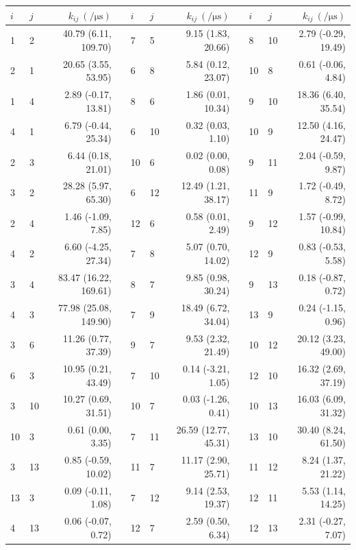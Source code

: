 \begin{table}[h!]
 \centering
 \begin{tabular}{llrp{0.2cm}llrp{0.2cm}llr}
 \toprule
 $i$ & $j$ &  $k_{ij}\ (\si{\per\micro\second})$ & & $i$ & $j$ &  $k_{ij}\ (\si{\per\micro\second})$ & & $i$ & $j$ &  $k_{ij}\ (\si{\per\micro\second})$ \\
 \midrule
 1 & 2 & 40.79 (6.11, 109.70) & & 7 & 5 & 9.15 (1.83, 20.66) & & 8 & 10 & 2.79 (-0.29, 19.49) \\
 2 & 1 & 20.65 (3.55, 53.95) & & 6 & 8 & 5.84 (0.12, 23.07) & & 10 & 8 & 0.61 (-0.06, 4.84) \\
 1 & 4 & 2.89 (-0.17, 13.81) & & 8 & 6 & 1.86 (0.01, 10.34) & & 9 & 10 & 18.36 (6.40, 35.54) \\
 4 & 1 & 6.79 (-0.44, 25.34) & & 6 & 10 & 0.32 (0.03, 1.10) & & 10 & 9 & 12.50 (4.16, 24.47) \\
 2 & 3 & 6.44 (0.18, 21.01) & & 10 & 6 & 0.02 (0.00, 0.08) & & 9 & 11 & 2.04 (-0.59, 9.87) \\
 3 & 2 & 28.28 (5.97, 65.30) & & 6 & 12 & 12.49 (1.21, 38.17) & & 11 & 9 & 1.72 (-0.49, 8.72) \\
 2 & 4 & 1.46 (-1.09, 7.85) & & 12 & 6 & 0.58 (0.01, 2.49) & & 9 & 12 & 1.57 (-0.99, 10.84) \\
 4 & 2 & 6.60 (-4.25, 27.34) & & 7 & 8 & 5.07 (0.70, 14.02) & & 12 & 9 & 0.83 (-0.53, 5.58) \\
 3 & 4 & 83.47 (16.22, 169.61) & & 8 & 7 & 9.85 (0.98, 30.24) & & 9 & 13 & 0.18 (-0.87, 0.72) \\
 4 & 3 & 77.98 (25.08, 149.90) & & 7 & 9 & 18.49 (6.72, 34.04) & & 13 & 9 & 0.24 (-1.15, 0.96) \\
 3 & 6 & 11.26 (0.77, 37.39) & & 9 & 7 & 9.53 (2.32, 21.49) & & 10 & 12 & 20.12 (3.23, 49.00) \\
 6 & 3 & 10.95 (0.21, 43.49) & & 7 & 10 & 0.14 (-3.21, 1.05) & & 12 & 10 & 16.32 (2.69, 37.19) \\
 3 & 10 & 10.27 (0.69, 31.51) & & 10 & 7 & 0.03 (-1.26, 0.41) & & 10 & 13 & 16.03 (6.09, 31.32) \\
 10 & 3 & 0.61 (0.00, 3.35) & & 7 & 11 & 26.59 (12.77, 45.31) & & 13 & 10 & 30.40 (8.24, 61.50) \\
 3 & 13 & 0.85 (-0.59, 10.02) & & 11 & 7 & 11.17 (2.90, 25.71) & & 11 & 12 & 8.24 (1.37, 21.22) \\
 13 & 3 & 0.09 (-0.11, 1.08) & & 7 & 12 & 9.14 (2.53, 19.37) & & 12 & 11 & 5.53 (1.14, 14.25) \\
 4 & 13 & 0.06 (-0.07, 0.72) & & 12 & 7 & 2.59 (0.50, 6.34) & & 12 & 13 & 2.31 (-0.27, 7.07) \\

\end{tabular}
\end{table}
